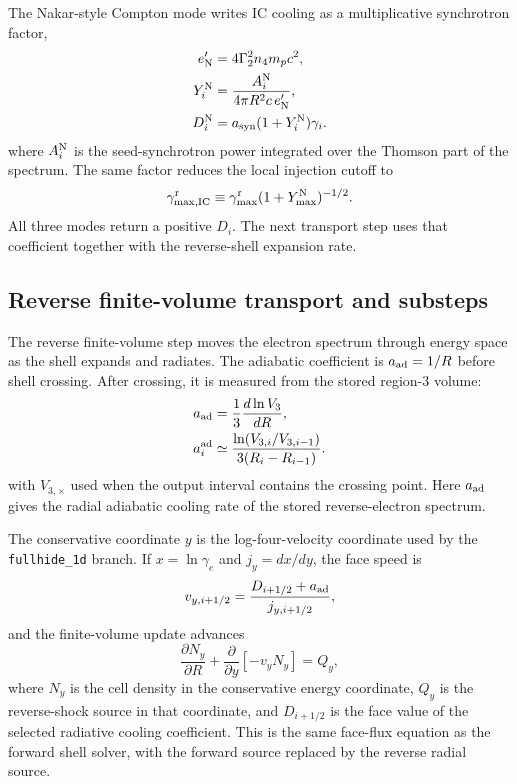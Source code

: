 \documentclass[twocolumn]{aastex702}
\begin{document}
The Nakar-style Compton mode writes IC cooling as a multiplicative synchrotron
factor,
\begin{equation}
\begin{aligned}
e_{\rm N}'&=4\Gamma_2^2 n_4m_pc^2,\\
Y_i^{\rm N}&=\frac{A_i^{\rm N}}{4\pi R^2c\,e_{\rm N}'},\\
D_i^{\rm N}&=a_{\rm syn}(1+Y_i^{\rm N})\gamma_i .
\end{aligned}
\end{equation}
where \(A_i^{\rm N}\) is the seed-synchrotron power integrated over the Thomson
part of the spectrum.  The same factor reduces the local injection cutoff to
\begin{equation}
\gamma_{\max,{\rm IC}}^{\rm r}
\equiv \gamma_{\max}^{\rm r}(1+Y_{\max}^{\rm N})^{-1/2}.
\end{equation}
All three modes return a positive \(D_i\).  The next transport step uses that
coefficient together with the reverse-shell expansion rate.

\subsection{Reverse finite-volume transport and substeps}

The reverse finite-volume step moves the electron spectrum through energy space
as the shell expands and radiates.  The adiabatic coefficient is \(a_{\rm ad}=1/R\)
before shell crossing.  After crossing, it is measured from the stored region-3
volume:
\begin{equation}
\begin{aligned}
a_{\rm ad}&=\frac{1}{3}\frac{d\ln V_3}{dR},\\
a_i^{\rm ad}&\simeq
\frac{\ln(V_{3,i}/V_{3,i-1})}{3(R_i-R_{i-1})}.
\end{aligned}
\end{equation}
with \(V_{3,\times}\) used when the output interval contains the crossing point.
Here \(a_{\rm ad}\) gives the radial adiabatic cooling rate of the stored
reverse-electron spectrum.

The conservative coordinate \(y\) is the log-four-velocity coordinate used by the
\texttt{fullhide\_1d} branch.  If \(x=\ln\gamma_e\) and
\(j_y=dx/dy\), the face speed is
\begin{equation}
v_{y,i+1/2}=
\frac{D_{i+1/2}+a_{\rm ad}}{j_{y,i+1/2}},
\end{equation}
and the finite-volume update advances
\begin{equation}
\frac{\partial N_y}{\partial R}
+
\frac{\partial}{\partial y}
\left[-v_yN_y\right]
=Q_y ,
\end{equation}
where \(N_y\) is the cell density in the conservative energy coordinate,
\(Q_y\) is the reverse-shock source in that coordinate, and \(D_{i+1/2}\) is the
face value of the selected radiative cooling coefficient.  This is the same
face-flux equation as the forward shell solver, with the forward source replaced
by the reverse radial source.
\end{document}
